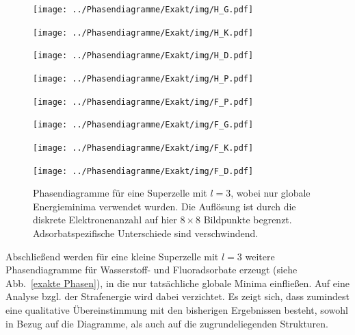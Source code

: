 \documentclass[a4paper, 10pt, twoside, openany]{book} %
\begin{document}
	\begin{figure}[b]
		\begin{minipage}[t]{0.31\textwidth}
			\texttt{[image: ../Phasendiagramme/Exakt/img/H\_G.pdf]}
			\label{HGx}
		\end{minipage}
		\hfill
		\begin{minipage}[t]{0.31\textwidth}
			\texttt{[image: ../Phasendiagramme/Exakt/img/H\_K.pdf]}
			\label{HKx}
		\end{minipage}
		\hfill
		\begin{minipage}[t]{0.31\textwidth}
			\texttt{[image: ../Phasendiagramme/Exakt/img/H\_D.pdf]}
			\label{HDx}
		\end{minipage}
		
		\bigskip
		
		\begin{minipage}[t]{0.31\textwidth}
			\texttt{[image: ../Phasendiagramme/Exakt/img/H\_P.pdf]}
			\label{HPx}
		\end{minipage}
		\hfill
		\parbox[b]{0.3\textwidth}{
			\caption[Phasendiagramme für globale Minima kleiner Systeme]{Phasendiagramme für eine Superzelle mit $l = 3$, wobei nur globale Energieminima verwendet wurden. Die Auflösung ist durch die diskrete Elektronenanzahl auf hier $8 \times 8$ Bildpunkte begrenzt. Adsorbatspezifische Unterschiede sind verschwindend.}
			\vspace{-1.5pc}
			\label{exakte Phasen}
			}
		\hfill
		\begin{minipage}[t]{0.31\textwidth}
			\texttt{[image: ../Phasendiagramme/Exakt/img/F\_P.pdf]}
			\label{FPx}
		\end{minipage}
		
		\bigskip
		
		\begin{minipage}[t]{0.31\textwidth}
			\texttt{[image: ../Phasendiagramme/Exakt/img/F\_G.pdf]}
			\label{FGx}
		\end{minipage}
		\hfill
		\begin{minipage}[t]{0.31\textwidth}
			\texttt{[image: ../Phasendiagramme/Exakt/img/F\_K.pdf]}
			\label{FKx}
		\end{minipage}
		\hfill
		\begin{minipage}[t]{0.31\textwidth}
			\texttt{[image: ../Phasendiagramme/Exakt/img/F\_D.pdf]}
			\label{FDx}
		\end{minipage}
	\end{figure}
	Abschließend werden für eine kleine Superzelle mit $l = 3$ weitere Phasendiagramme für Wasserstoff- und Fluoradsorbate erzeugt (siehe Abb.~\ref{exakte Phasen}), in die nur tatsächliche globale Minima einfließen. Auf eine Analyse bzgl. der Strafenergie wird dabei verzichtet. Es zeigt sich, dass zumindest eine qualitative Übereinstimmung mit den bisherigen Ergebnissen besteht, sowohl in Bezug auf die Diagramme, als auch auf die zugrundeliegenden Strukturen.
	
\end{document}
